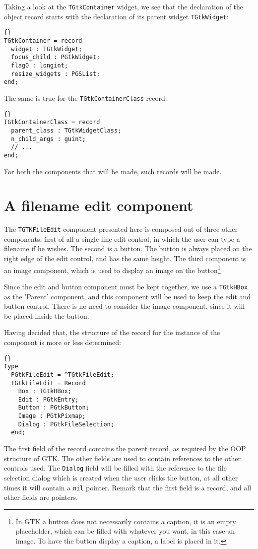\documentclass[10pt]{article}
\begin{document}
Taking a look at the \lstinline|TGtkContainer| widget, we see that the declaration
of the object record starts with the declaration of its parent widget 
\lstinline|TGtkWidget|:
\begin{lstlisting}{}
TGtkContainer = record
  widget : TGtkWidget;
  focus_child : PGtkWidget;
  flag0 : longint;
  resize_widgets : PGSList;
end;
\end{lstlisting}
The same is true for the \lstinline|TGtkContainerClass| record:
\begin{lstlisting}{}
TGtkContainerClass = record
  parent_class : TGtkWidgetClass;  
  n_child_args : guint;
  // ...
end;
\end{lstlisting}
For both the components that will be made, such records will be made.

\section{A filename edit component}
The \lstinline|TGTKFileEdit| component presented here is composed out of three 
other components; first of all a single line edit control, in which the
user can type a filename if he wishes. The second is a button. The button
is always placed on the right edge of the edit control, and has the same
height. The third component is an image component, which is used to display
an image on the button\footnote{In GTK a button does not necessarily contains a
caption, it is an empty placeholder, which can be filled with whatever 
you want, in this case an image. To have the button display a caption, 
a label is placed in it.}

Since the edit and button component must be kept together, we use a
\lstinline|TGtkHBox| as the 'Parent' component, and this component will be
used to keep the edit and button control. There is no need to consider the
image component, since it will be placed inside the button.

Having decided that, the structure of the record for the instance of the
component is more or less determined:
\begin{lstlisting}{}
Type
  PGtkFileEdit = ^TGtkFileEdit;
  TGtkFileEdit = Record
    Box : TGtkHBox;
    Edit : PGtkEntry;
    Button : PGtkButton;
    Image : PGtkPixmap;
    Dialog : PGtkFileSelection;
  end;
\end{lstlisting}
The first field of the record contains the parent record, as required
by the OOP structure of GTK. The other fields are used to contain references
to the other controls used. The \lstinline|Dialog| field will be filled with the
reference to the file selection dialog which is created when the user clicks
the button, at all other times it will contain a \lstinline|nil| pointer.
Remark that the first field is a record, and all other fields are pointers.
\end{document}

